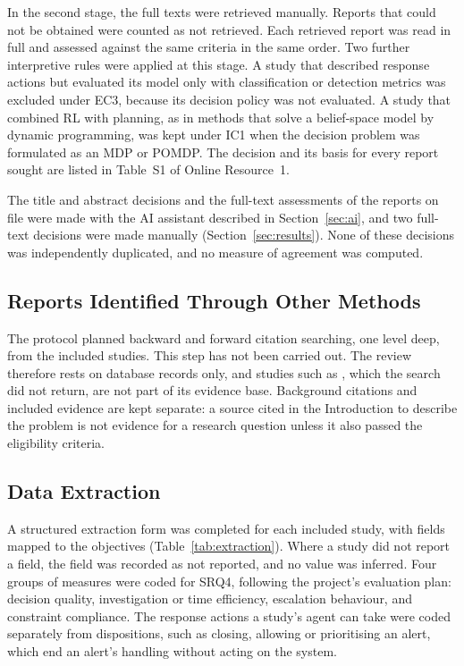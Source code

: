 \documentclass[pdflatex,sn-basic]{sn-jnl}
\begin{document}
In the second stage, the full texts were retrieved manually. Reports that could not be obtained were counted as not retrieved. Each retrieved report was read in full and assessed against the same criteria in the same order. Two further interpretive rules were applied at this stage. A study that described response actions but evaluated its model only with classification or detection metrics was excluded under EC3, because its decision policy was not evaluated. A study that combined RL with planning, as in methods that solve a belief-space model by dynamic programming, was kept under IC1 when the decision problem was formulated as an MDP or POMDP. The decision and its basis for every report sought are listed in Table~S1 of Online Resource~1.

The title and abstract decisions and the full-text assessments of the reports on file were made with the AI assistant described in Section~\ref{sec:ai}, and two full-text decisions were made manually (Section~\ref{sec:results}). None of these decisions was independently duplicated, and no measure of agreement was computed.

\subsection{Reports Identified Through Other Methods}
\label{sec:other}

The protocol planned backward and forward citation searching, one level deep, from the included studies. This step has not been carried out. The review therefore rests on database records only, and studies such as \citet{ren2025}, which the search did not return, are not part of its evidence base. Background citations and included evidence are kept separate: a source cited in the Introduction to describe the problem is not evidence for a research question unless it also passed the eligibility criteria.

\subsection{Data Extraction}\label{sec:extraction}

A structured extraction form was completed for each included study, with fields mapped to the objectives (Table~\ref{tab:extraction}). Where a study did not report a field, the field was recorded as not reported, and no value was inferred. Four groups of measures were coded for SRQ4, following the project's evaluation plan: decision quality, investigation or time efficiency, escalation behaviour, and constraint compliance. The response actions a study's agent can take were coded separately from dispositions, such as closing, allowing or prioritising an alert, which end an alert's handling without acting on the system.
\end{document}
